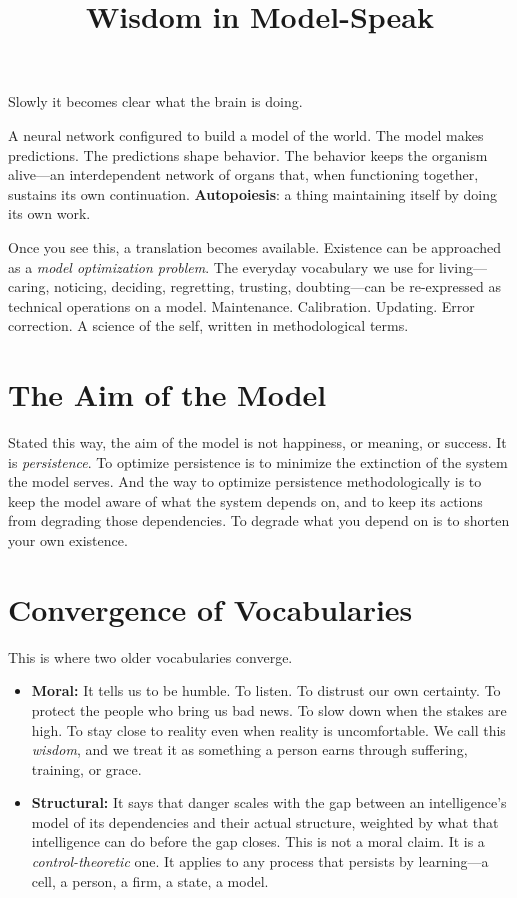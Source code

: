 \documentclass{article}
\title{Wisdom in Model-Speak}
\author{}
\date{}
\begin{document}
\maketitle

\section*{}

Slowly it becomes clear what the brain is doing.

A neural network configured to build a model of the world. The model makes predictions. The predictions shape behavior. The behavior keeps the organism alive---an interdependent network of organs that, when functioning together, sustains its own continuation. \textbf{Autopoiesis}: a thing maintaining itself by doing its own work.

Once you see this, a translation becomes available. Existence can be approached as a \textit{model optimization problem}. The everyday vocabulary we use for living---caring, noticing, deciding, regretting, trusting, doubting---can be re-expressed as technical operations on a model. Maintenance. Calibration. Updating. Error correction. A science of the self, written in methodological terms.

\section*{The Aim of the Model}

Stated this way, the aim of the model is not happiness, or meaning, or success. It is \textit{persistence}. To optimize persistence is to minimize the extinction of the system the model serves. And the way to optimize persistence methodologically is to keep the model aware of what the system depends on, and to keep its actions from degrading those dependencies. To degrade what you depend on is to shorten your own existence.

\section*{Convergence of Vocabularies}

This is where two older vocabularies converge.

\begin{itemize}
    \item \textbf{Moral:} It tells us to be humble. To listen. To distrust our own certainty. To protect the people who bring us bad news. To slow down when the stakes are high. To stay close to reality even when reality is uncomfortable. We call this \textit{wisdom}, and we treat it as something a person earns through suffering, training, or grace.

    \item \textbf{Structural:} It says that danger scales with the gap between an intelligence's model of its dependencies and their actual structure, weighted by what that intelligence can do before the gap closes. This is not a moral claim. It is a \textit{control-theoretic} one. It applies to any process that persists by learning---a cell, a person, a firm, a state, a model.
\end{itemize}
\end{document}
